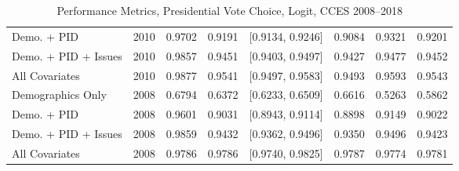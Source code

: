 \begin{table}[H]
\begin{tabular}{lrrrlrrr}
  Demo. + PID & 2010 & 0.9702 & 0.9191 & [0.9134, 0.9246] & 0.9084 & 0.9321 & 0.9201 \\ 
  Demo. + PID + Issues & 2010 & 0.9857 & 0.9451 & [0.9403, 0.9497] & 0.9427 & 0.9477 & 0.9452 \\ 
  All Covariates & 2010 & 0.9877 & 0.9541 & [0.9497, 0.9583] & 0.9493 & 0.9593 & 0.9543 \\ 
  Demographics Only & 2008 & 0.6794 & 0.6372 & [0.6233, 0.6509] & 0.6616 & 0.5263 & 0.5862 \\ 
  Demo. + PID & 2008 & 0.9601 & 0.9031 & [0.8943, 0.9114] & 0.8898 & 0.9149 & 0.9022 \\ 
  Demo. + PID + Issues & 2008 & 0.9859 & 0.9432 & [0.9362, 0.9496] & 0.9350 & 0.9496 & 0.9423 \\ 
  All Covariates & 2008 & 0.9786 & 0.9786 & [0.9740, 0.9825] & 0.9787 & 0.9774 & 0.9781 \\ 
   \bottomrule
\end{tabular}
\caption{Performance Metrics, Presidential Vote Choice, Logit, CCES 2008--2018} 
\label{tab:cces_preschoice_logit}
\end{table}
